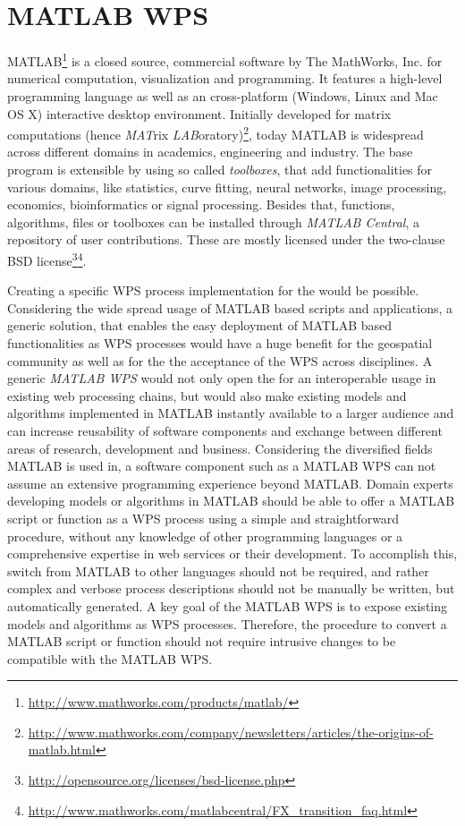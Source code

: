 
\chapter{MATLAB WPS}

MATLAB\footnote{\url{http://www.mathworks.com/products/matlab/}} is a closed source, commercial software by The MathWorks, Inc. for numerical computation, visualization and programming. It features a high-level programming language as well as an cross-platform (Windows, Linux and Mac OS X) interactive desktop environment. Initially developed for matrix computations (hence \emph{MAT}rix \emph{LAB}oratory)\footnote{\url{http://www.mathworks.com/company/newsletters/articles/the-origins-of-matlab.html}}, today MATLAB is widespread across different domains in academics, engineering and industry. The base program is extensible by using so called \emph{toolboxes}, that add functionalities for various domains, like statistics, curve fitting, neural networks, image processing, economics, bioinformatics or signal processing. Besides that, functions, algorithms, files or toolboxes can be installed through \emph{MATLAB Central}, a repository of user contributions. These are mostly licensed under the two-clause BSD license\footnote{\url{http://opensource.org/licenses/bsd-license.php}}\footnote{\url{http://www.mathworks.com/matlabcentral/FX_transition_faq.html}}.

Creating a specific \ac{WPS} process implementation for the \la would be possible. Considering the wide spread usage of MATLAB based scripts and applications, a generic solution, that enables the easy deployment of MATLAB based functionalities as \ac{WPS} processes would have a huge benefit for the geospatial community as well as for the the acceptance of the \ac{WPS} across disciplines. A generic \emph{MATLAB WPS} would not only open the \la for an interoperable usage in existing web processing chains, but would also make existing models and algorithms implemented in MATLAB instantly available to a larger audience and can increase reusability of software components and exchange between different areas of research, development and business. Considering the diversified fields MATLAB is used in, a software component such as a MATLAB WPS can not assume an extensive programming experience beyond MATLAB. Domain experts developing models or algorithms in MATLAB should be able to offer a MATLAB script or function as a \ac{WPS} process using a simple and straightforward procedure, without any knowledge of other programming languages or a comprehensive expertise in web services or their development. To accomplish this, switch from MATLAB to other languages should not be required, and rather complex and verbose process descriptions should not be manually be written, but automatically generated. A key goal of the MATLAB WPS is to expose existing models and algorithms as \ac{WPS} processes. Therefore, the procedure to convert a MATLAB script or function should not require intrusive changes to be compatible with the MATLAB WPS.

